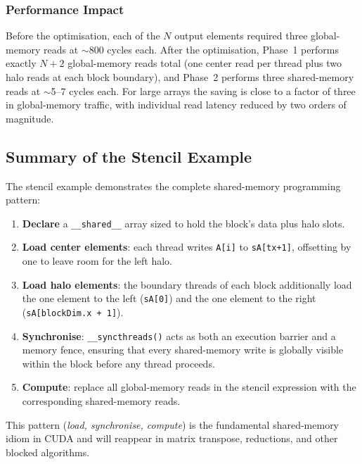 \subsubsection{Performance Impact}
 
Before the optimisation, each of the $N$ output elements required three
global-memory reads at $\sim$800 cycles each. After the optimisation, Phase~1
performs exactly $N + 2$ global-memory reads total (one center read per thread
plus two halo reads at each block boundary), and Phase~2 performs three
shared-memory reads at $\sim$5--7 cycles each. For large arrays the saving is
close to a factor of three in global-memory traffic, with individual read
latency reduced by two orders of magnitude.
 
\subsection{Summary of the Stencil Example}

 
The stencil example demonstrates the complete shared-memory programming pattern:
 
\begin{enumerate}
  \item \textbf{Declare} a \texttt{\_\_shared\_\_} array sized to hold the
        block's data plus halo slots.
  \item \textbf{Load center elements}: each thread writes \texttt{A[i]} to
        \texttt{sA[tx+1]}, offsetting by one to leave room for the left halo.
  \item \textbf{Load halo elements}: the boundary threads of each block
        additionally load the one element to the left (\texttt{sA[0]}) and
        the one element to the right (\texttt{sA[blockDim.x + 1]}).
  \item \textbf{Synchronise}: \texttt{\_\_syncthreads()} acts as both an
        execution barrier and a memory fence, ensuring that every shared-memory
        write is globally visible within the block before any thread proceeds.
  \item \textbf{Compute}: replace all global-memory reads in the stencil
        expression with the corresponding shared-memory reads.
\end{enumerate}
 
 
This pattern (\emph{load, synchronise, compute}) is the fundamental
shared-memory idiom in CUDA and will reappear in matrix transpose, reductions,
and other blocked algorithms.

